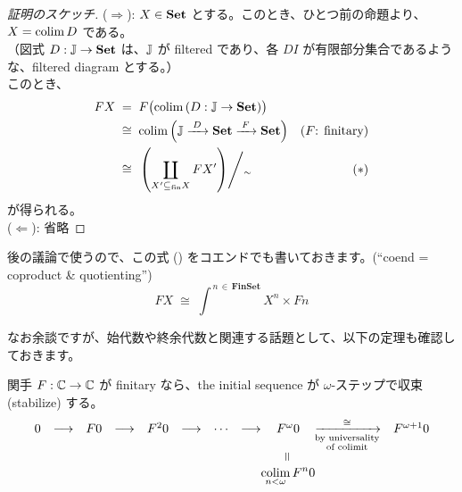 \documentclass[
		head_space=20mm,
		foot_space=20mm,
		gutter=10mm,
		line_length=190mm
]{jlreq}
\begin{document}
\begin{proof}[証明のスケッチ]
	($\Rightarrow$): $X\in\mathbf{Set}$ とする。このとき、ひとつ前の命題より、$X=\operatorname*{colim} D$ である。\\ （図式 $D:\mathbb{J}\to \mathbf{Set}$ は、$\mathbb{J}$ が filtered であり、各 $DI$ が有限部分集合であるような、filtered diagram とする。）\\ このとき、
	\begin{align*}
		FX &\;=\; F\bigl(\operatorname*{colim}\,(D:\mathbb{J}\to\mathbf{Set})\bigr) \\
		&\;\cong\; \operatorname*{colim} \left(\mathbb{J}\xrightarrow{\;D\;}\mathbf{Set}\xrightarrow{\;F\;}\mathbf{Set}\right) & \textrm{($F$: finitary)}\\
		&\;\cong\;\left.\left(\coprod_{X'\subseteq_{\mathrm{fin}} X} FX'\right)\middle/_{\sim}\right. & (\ast)
	\end{align*}
	が得られる。\vspace{5pt}\\
	($\Leftarrow$): 省略
\end{proof}

\noindent 後の議論で使うので、この式 (\ast) をコエンドでも書いておきます。(``coend = coproduct \& quotienting'')
\[FX\;\cong\;\int^{\,n\,\in\,\mathbf{FinSet}}X^n \times Fn\]

\clearpage

\noindent なお余談ですが、始代数や終余代数と関連する話題として、以下の定理も確認しておきます。


\begin{theorem}
	関手 $F:\mathbb{C}\to\mathbb{C}$ が finitary なら、the initial sequence が $\omega$-ステップで収束 (stabilize) する。
	\[\begin{array}{ccccccccccc}0&\longrightarrow& F0&\longrightarrow&F^20&\longrightarrow&\cdots&\longrightarrow&F^\omega 0&\xrightarrow[\!\!\substack{\textrm{by universality}\\\textrm{of colimit}}\!\!]{\cong}&F^{\omega+1}0\\{}&{}&{}&{}&{}&{}&{}&{}&\rotatebox{90}{$=$}&{}&{}\\{}&{}&{}&{}&{}&{}&{}&{}&\!\!\!\!\!\!\displaystyle\colim_{n<\omega}F^n0\!\!\!\!\!\!&{}&{}\end{array}\]
\end{theorem}
\end{document}
